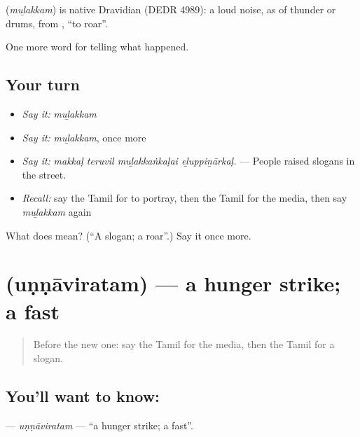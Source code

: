 \begin{cousinweb}
\textbf{} (\emph{muḻakkam}) is native Dravidian (DEDR 4989): a loud noise, as of thunder or drums, from , \textquotedblleft{}to roar\textquotedblright{}.
\end{cousinweb}

\begin{grammarlens}[title={What you've built}]
One more word for telling what happened.
\end{grammarlens}

\subsection*{Your turn}
\begin{itemize}
\raggedright
  \item \emph{Say it:} \emph{muḻakkam}
  \item \emph{Say it:} \emph{muḻakkam}, once more
  \item \emph{Say it:} \emph{makkaḷ teruvil muḻakkaṅkaḷai eḻuppiṉārkaḷ.} — People raised slogans in the street.
  \item \emph{Recall:} say the Tamil for to portray, then the Tamil for the media, then say \emph{muḻakkam} again
\end{itemize}

\begin{tcolorbox}[breakable,colback=teal!4,colframe=teal!35!black,title={Before you move on}]
What does  mean? (\textquotedblleft{}A slogan; a roar\textquotedblright{}.) Say it once more.
\end{tcolorbox}
\section[\texorpdfstring{\ta{உண்ணாவிரதம்} (uṇṇāviratam)}{உண்ணாவிரதம் (uṇṇāviratam)}]{ (uṇṇāviratam) — a hunger strike; a fast}

\label{lesson:TA-C311-unnaviratam}



\begin{quote}
Before the new one: say the Tamil for the media, then the Tamil for a slogan.
\end{quote}

\subsection*{You'll want to know: }
\textbf{} — \emph{uṇṇāviratam} — \textquotedblleft{}a hunger strike; a fast\textquotedblright{}.

